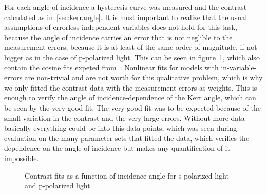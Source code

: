 \documentclass[a4paper,10pt]{scrartcl}
\begin{document}
For each angle of incidence a hysteresis curve was measured and the contrast calculated as in~\ref{sec:kerrangle}. It is most important to realize that the usual assumptions of errorless independent variables does not hold for this task, because the angle of incidence carries an error that is not neglible to the measurement errors, because it is at least of the same order of magnitude, if not bigger as in the case of p-polarized light. This can be seen in figure~\ref{fig:angledep}, which also contain the cosine fits expeted from~\cite{zak}. Nonlinear fits for models with in-variable-errors are non-trivial and are not worth for this qualitative problem, which is why we only fitted the contrast data with the measurement errors as weights. This is enough to verify the angle of incidence-dependence of the Kerr angle, which can be seen by the very good fit. The very good fit was to be expected because of the small variation in the contrast and the very large errors. Without more data basically everything could be into this data points, which was seen during evaluation on the many parameter sets that fitted the data, which verifies the dependence on the angle of incidence but makes any quantification of it impossible.

\begin{figure}
\centering
{}
\caption{Contrast fits as a function of incidence angle for s-polarized light  and p-polarized light  \label{fig:angledep}}
\end{figure}
\end{document}
